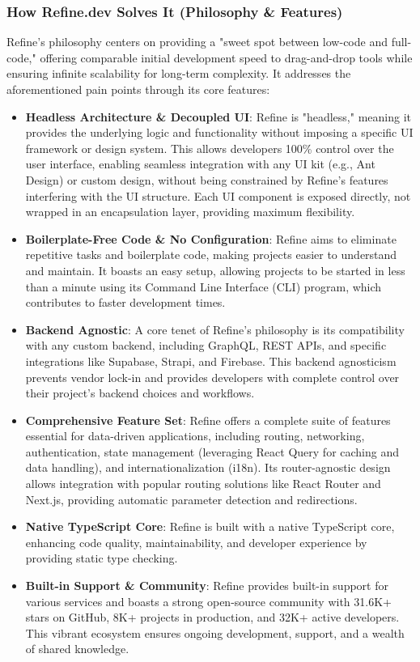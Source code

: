 \subsubsection*{How Refine.dev Solves It (Philosophy \& Features)}
Refine's philosophy centers on providing a "sweet spot between low-code and full-code," offering comparable initial development speed to drag-and-drop tools while ensuring infinite scalability for long-term complexity. It addresses the aforementioned pain points through its core features:

\begin{itemize}
    \item \textbf{Headless Architecture \& Decoupled UI}: Refine is "headless," meaning it provides the underlying logic and functionality without imposing a specific UI framework or design system. This allows developers 100\% control over the user interface, enabling seamless integration with any UI kit (e.g., Ant Design) or custom design, without being constrained by Refine's features interfering with the UI structure. Each UI component is exposed directly, not wrapped in an encapsulation layer, providing maximum flexibility.
    \item \textbf{Boilerplate-Free Code \& No Configuration}: Refine aims to eliminate repetitive tasks and boilerplate code, making projects easier to understand and maintain. It boasts an easy setup, allowing projects to be started in less than a minute using its Command Line Interface (CLI) program, which contributes to faster development times.
    \item \textbf{Backend Agnostic}: A core tenet of Refine's philosophy is its compatibility with any custom backend, including GraphQL, REST APIs, and specific integrations like Supabase, Strapi, and Firebase. This backend agnosticism prevents vendor lock-in and provides developers with complete control over their project's backend choices and workflows.
    \item \textbf{Comprehensive Feature Set}: Refine offers a complete suite of features essential for data-driven applications, including routing, networking, authentication, state management (leveraging React Query for caching and data handling), and internationalization (i18n). Its router-agnostic design allows integration with popular routing solutions like React Router and Next.js, providing automatic parameter detection and redirections.
    \item \textbf{Native TypeScript Core}: Refine is built with a native TypeScript core, enhancing code quality, maintainability, and developer experience by providing static type checking.
    \item \textbf{Built-in Support \& Community}: Refine provides built-in support for various services and boasts a strong open-source community with 31.6K+ stars on GitHub, 8K+ projects in production, and 32K+ active developers. This vibrant ecosystem ensures ongoing development, support, and a wealth of shared knowledge.
\end{itemize}

